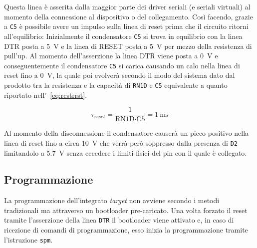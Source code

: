 Questa linea è asserita dalla maggior parte dei driver seriali (e seriali virtuali) al momento della connessione al dispositivo o del collegamento. Così facendo, grazie a \texttt{C5} è possibile avere un impulso sulla linea di reset prima che il circuito ritorni all'equilibrio: Inizialmente il condensatore \texttt{C5} si trova in equilibrio con la linea DTR posta a \SI{5}{\volt} e la linea di RESET posta a \SI{5}{\volt} per mezzo della resistenza di pull'up. Al momento dell'asserzione la linea DTR viene posta a \SI{0}{\volt} e conseguentemente il condensatore \texttt{C5} si carica causando un calo nella linea di reset fino a \SI{0}{\volt}, la quale poi evolverà secondo il modo del sistema dato dal prodotto tra la resistenza e la capacità di \texttt{RN1D} e \texttt{C5} equivalente a quanto riportato nell'~\cref{eq:rcstrrst}.

\begin{equation}\label{eq:rcstrrst}
    \tau_{reset} = \frac{1}{\text{RN1D} \cdot \text{C5}} = \SI{1}{\milli\second}
\end{equation}

Al momento della disconnessione il condensatore causerà un picco positivo nella linea di reset fino a circa \SI{10}{\volt} che verrà però soppresso dalla presenza di \texttt{D2} limitandolo a \SI{5.7}{\volt} senza eccedere i limiti fisici del pin con il quale è collegato\cite[sec 29.1]{avr:m328p}.

\subsection{Programmazione}

La programmazione dell'integrato \textit{target} non avviene secondo i metodi tradizionali ma attraverso un bootloader pre-caricato\cite[bootloaders/atmega/ATmegaBOOT\_168.c]{git:arduinocore}. 
Una volta forzato il reset tramite l'asserzione della linea \texttt{DTR} il bootloader viene attivato e, in caso di ricezione di comandi di programmazione, esso inizia la programmazione tramite l'istruzione \texttt{spm}.

